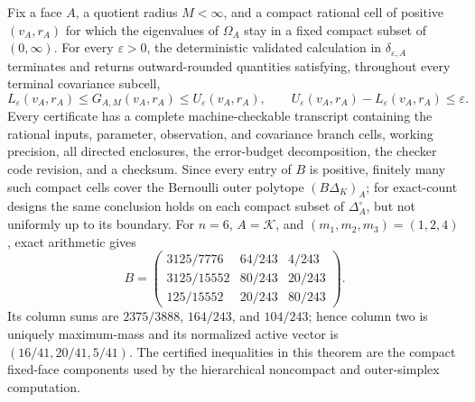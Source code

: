 Fix a face \(A\), a quotient radius \(M<\infty\), and a compact rational cell of positive \((v_A,r_A)\) for which the eigenvalues of \(\Omega_A\) stay in a fixed compact subset of \((0,\infty)\).  For every \(\varepsilon>0\), the deterministic validated calculation in \(\delta_{\varepsilon,A}\) terminates and returns outward-rounded quantities satisfying, throughout every terminal covariance subcell,
\[
L_\varepsilon(v_A,r_A)\leq G_{A,M}(v_A,r_A)\leq U_\varepsilon(v_A,r_A),
\qquad U_\varepsilon(v_A,r_A)-L_\varepsilon(v_A,r_A)\leq\varepsilon.
\]
Every certificate has a complete machine-checkable transcript containing the rational inputs, parameter, observation, and covariance branch cells, working precision, all directed enclosures, the error-budget decomposition, the checker code revision, and a checksum.  Since every entry of \(B\) is positive, finitely many such compact cells cover the Bernoulli outer polytope \((B\Delta_K)_A\); for exact-count designs the same conclusion holds on each compact subset of \(\Delta_A^\circ\), but not uniformly up to its boundary.  For \(n=6\), \(A=\mathcal K\), and \((m_1,m_2,m_3)=(1,2,4)\), exact arithmetic gives
\[
B=\begin{pmatrix}3125/7776&64/243&4/243\\3125/15552&80/243&20/243\\125/15552&20/243&80/243\end{pmatrix}.
\]
Its column sums are \(2375/3888\), \(164/243\), and \(104/243\); hence column two is uniquely maximum-mass and its normalized active vector is \((16/41,20/41,5/41)\).  The certified inequalities in this theorem are the compact fixed-face components used by the hierarchical noncompact and outer-simplex computation.